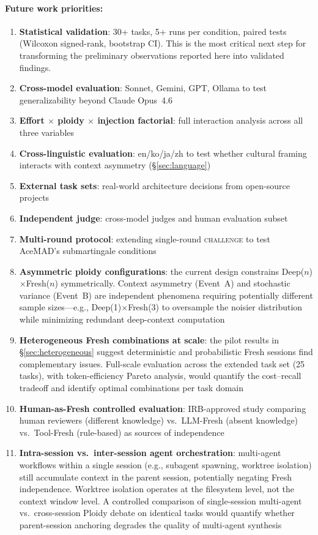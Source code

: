 \documentclass[11pt]{article}
\begin{document}
\paragraph{Future work priorities:}
\begin{enumerate}[label=\arabic*., leftmargin=1.5em]
  \item \textbf{Statistical validation}: 30+ tasks, 5+ runs per condition, paired tests (Wilcoxon signed-rank, bootstrap CI). This is the most critical next step for transforming the preliminary observations reported here into validated findings.
  \item \textbf{Cross-model evaluation}: Sonnet, Gemini, GPT, Ollama to test generalizability beyond Claude Opus~4.6
  \item \textbf{Effort $\times$ ploidy $\times$ injection factorial}: full interaction analysis across all three variables
  \item \textbf{Cross-linguistic evaluation}: en/ko/ja/zh to test whether cultural framing interacts with context asymmetry (\S\ref{sec:language})
  \item \textbf{External task sets}: real-world architecture decisions from open-source projects
  \item \textbf{Independent judge}: cross-model judges and human evaluation subset
  \item \textbf{Multi-round protocol}: extending single-round \textsc{challenge} to test AceMAD's submartingale conditions
  \item \textbf{Asymmetric ploidy configurations}: the current design constrains Deep($n$)$\times$Fresh($n$) symmetrically. Context asymmetry (Event~A) and stochastic variance (Event~B) are independent phenomena requiring potentially different sample sizes---e.g., Deep(1)$\times$Fresh(3) to oversample the noisier distribution while minimizing redundant deep-context computation
  \item \textbf{Heterogeneous Fresh combinations at scale}: the pilot results in \S\ref{sec:heterogeneous} suggest deterministic and probabilistic Fresh sessions find complementary issues. Full-scale evaluation across the extended task set (25 tasks), with token-efficiency Pareto analysis, would quantify the cost--recall tradeoff and identify optimal combinations per task domain
  \item \textbf{Human-as-Fresh controlled evaluation}: IRB-approved study comparing human reviewers (different knowledge) vs.\ LLM-Fresh (absent knowledge) vs.\ Tool-Fresh (rule-based) as sources of independence
  \item \textbf{Intra-session vs.\ inter-session agent orchestration}: multi-agent workflows within a single session (e.g., subagent spawning, worktree isolation) still accumulate context in the parent session, potentially negating Fresh independence. Worktree isolation operates at the filesystem level, not the context window level. A controlled comparison of single-session multi-agent vs.\ cross-session Ploidy debate on identical tasks would quantify whether parent-session anchoring degrades the quality of multi-agent synthesis
\end{enumerate}
\end{document}
